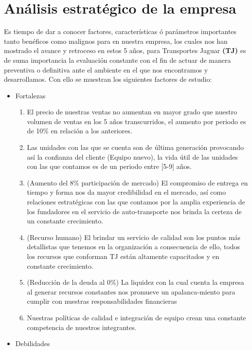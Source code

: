 \section{Análisis estratégico de la empresa}
	Es tiempo de dar a conocer factores, características ó  parámetros importantes tanto benéficos como malignos para en nuestra empresa, los cuales nos han mostrado el avance y retroceso en estos 5 años, para Transportes Jaguar \textbf{(TJ)} es de suma importancia la evaluación constante con el fin de actuar de manera preventiva o definitiva ante el ambiente en el que nos encontramos y desarrollamos. Con ello se muestran los siguientes factores de estudio:
	
\begin{itemize}
	\item[\itembolasazules{F}] Fortalezas
		\begin{enumerate}
			\item El precio de nuestras ventas no aumentan en mayor grado que nuestro volumen de ventas en los 5 años transcurridos, el aumento por periodo es de 10\% en relación a los anteriores.
			\item Las unidades con las que se cuenta son de última generación provocando así la confianza del cliente (Equipo nuevo), la vida útil de las unidades con las que contamos es de un periodo entre [5-9] años.
			\item (Aumento del 8\% participación de mercado) El compromiso de entrega en tiempo y forma nos da mayor credibilidad en el mercado,  así como relaciones estratégicas con las que contamos por la amplia experiencia de los fundadores en el servicio de auto-transporte nos brinda la certeza de un constante crecimiento.
			\item (Recurso humano) El brindar un servicio de calidad son los puntos más detallistas que tenemos en la organización a consecuencia de ello, todos los recursos que conforman TJ están altamente capacitados  y en constante crecimiento.
			\item (Reducción de la deuda al 0\%) La liquidez con la cual cuenta la empresa al generar recursos constantes nos promueve un apalanca-miento para cumplir con nuestras responsabilidades financieras
			\item Nuestras políticas de calidad e integración de equipo crean una constante competencia de nuestros integrantes.
		\end{enumerate}
	\item[\itembolasazules{D}] Debilidades
		\begin{enumerate}

\end{enumerate}
\end{itemize}
